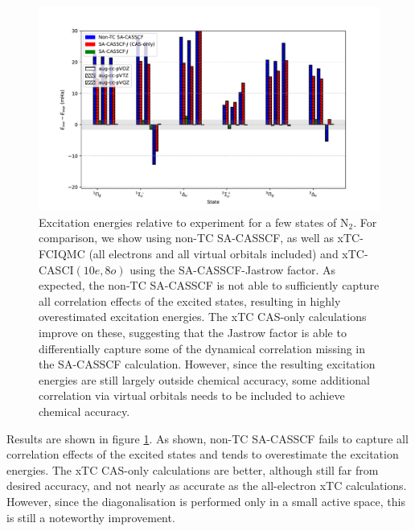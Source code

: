 \begin{figure}[htbp]
    \centering
    \includegraphics[width=\textwidth]{figures/binding/n2_exc_cas.pdf}
    \caption{Excitation energies relative to experiment for a few states of N$_2$. For comparison, we show using non-TC SA-CASSCF, as well as xTC-FCIQMC (all electrons and all virtual orbitals included) and xTC-CASCI$(10e,8o)$ using the SA-CASSCF-Jastrow factor. As expected, the non-TC SA-CASSCF is not able to sufficiently capture all correlation effects of the excited states, resulting in highly overestimated excitation energies.
    The xTC CAS-only calculations improve on these, suggesting that the Jastrow factor is able to differentially capture some of the dynamical correlation missing in the SA-CASSCF calculation. However, since the resulting excitation energies are still largely outside chemical accuracy, some additional correlation via virtual orbitals needs to be included to achieve chemical accuracy.
    }
    \label{fig:n2-excite-relative-cas}
\end{figure}

Results are shown in figure \ref{fig:n2-excite-relative-cas}. As shown, non-TC SA-CASSCF fails to capture all correlation effects of the excited states and tends to overestimate the excitation energies. The xTC CAS-only calculations are better, although still far from desired accuracy, and not nearly as accurate as the all-electron xTC calculations. However, since the diagonalisation is performed only in a small active space, this is still a noteworthy improvement.


